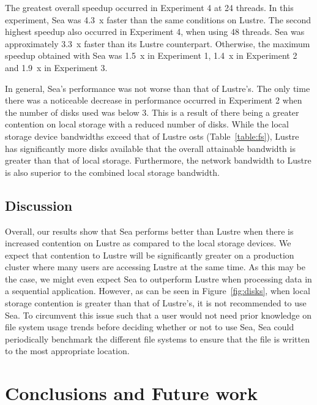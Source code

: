 \documentclass{report}
\begin{document}
    The greatest overall speedup occurred in Experiment 4 at 24 threads. In 
    this experiment, Sea was 4.3~x faster than the same conditions on Lustre.
    The second highest speedup also occurred in Experiment 4, when using 48
    threads. Sea was approximately 3.3~x faster than its Lustre counterpart.
    Otherwise, the maximum speedup obtained with Sea was 1.5~x in Experiment 1,
    1.4~x in Experiment 2 and 1.9~x in Experiment 3.

    In general, Sea's performance was not worse than that of Lustre's. The only
    time there was a noticeable decrease in performance occurred in Experiment 2
    when the number of disks used was below 3. This is a result of there being
    a greater contention on local storage with a reduced number of disks. While
    the local storage device bandwidths exceed that of Lustre \gls{ost}s (Table~\ref{table:fs}), Lustre has significantly more disks available that the overall
    attainable bandwidth is greater than that of local storage. Furthermore, 
    the network bandwidth to Lustre is also superior to the combined local
    storage bandwidth.

    \section{Discussion}\label{discussion}

    Overall, our results show that Sea performs better than Lustre when there is
    increased contention on Lustre as compared to the local storage devices. We
    expect that contention to Lustre will be significantly greater on a 
    production cluster where many users are accessing Lustre at the same time.
    As this may be the case, we might even expect Sea to outperform Lustre when
    processing data in a sequential application. However, as can be seen in
    Figure~\ref{fig:disks}, when local storage contention is greater than that
    of Lustre's, it is not recommended to use Sea. To circumvent this issue
    such that a user would not need prior knowledge on file system usage trends
    before deciding whether or not to use Sea, Sea could periodically benchmark
    the different file systems to ensure that the file is written to the most
    appropriate location.






    \chapter{Conclusions and Future work}
\end{document}

